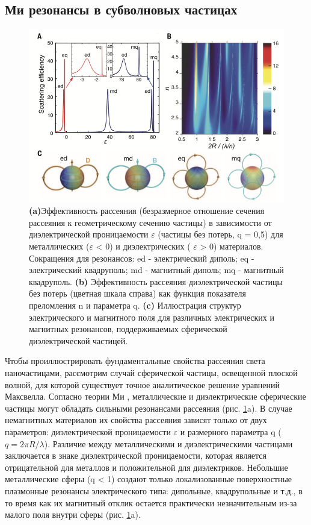 \subsection*{Ми резонансы в субволновых частицах}

\begin{figure}[h!]
	\centering
	\includegraphics[width=0.7\linewidth]{images/fig1.png}
	\caption{\textbf{(a)}Эффективность рассеяния (безразмерное отношение сечения рассеяния к геометрическому сечению частицы) в зависимости от диэлектрической проницаемости $\varepsilon$ (частицы без потерь, q = 0,5) для металлических ($\varepsilon$  < 0) и диэлектрических ( $\varepsilon$ > 0) материалов. Сокращения для резонансов: ed - электрический диполь; eq - электрический квадруполь; md - магнитный диполь; mq - магнитный квадруполь. \textbf{(b)} Эффективность рассеяния диэлектрической частицы без потерь (цветная шкала справа) как функция показателя преломления n и параметра q. \textbf{(c)} Иллюстрация структур электрического и магнитного поля для различных электрических и магнитных резонансов, поддерживаемых сферической диэлектрической частицей. \cite{kuznetsov2016optically}}
	\label{fig1}
\end{figure}
\hspace*{2mm}
Чтобы проиллюстрировать фундаментальные свойства рассеяния света наночастицами, рассмотрим случай сферической частицы, освещенной плоской волной, для которой существует точное аналитическое решение уравнений Максвелла. Согласно теории Ми \cite{absorbScattLight}, металлические и диэлектрические сферические частицы могут обладать сильными резонансами рассеяния (рис. \ref{fig1}a). В случае немагнитных материалов их свойства рассеяния зависят только от двух параметров: диэлектрической проницаемости $\varepsilon$  и размерного параметра q ($q = 2\pi R/\lambda$). Различие между металлическими и диэлектрическими частицами заключается в знаке диэлектрической проницаемости, которая является отрицательной для металлов и положительной для диэлектриков. Небольшие металлические сферы (q < 1) создают только локализованные поверхностные плазмонные резонансы электрического типа:  дипольные, квадрупольные и т.д., в то время как их магнитный отклик остается практически незначительным из-за малого поля внутри сферы (рис. \ref{fig1}a).  
